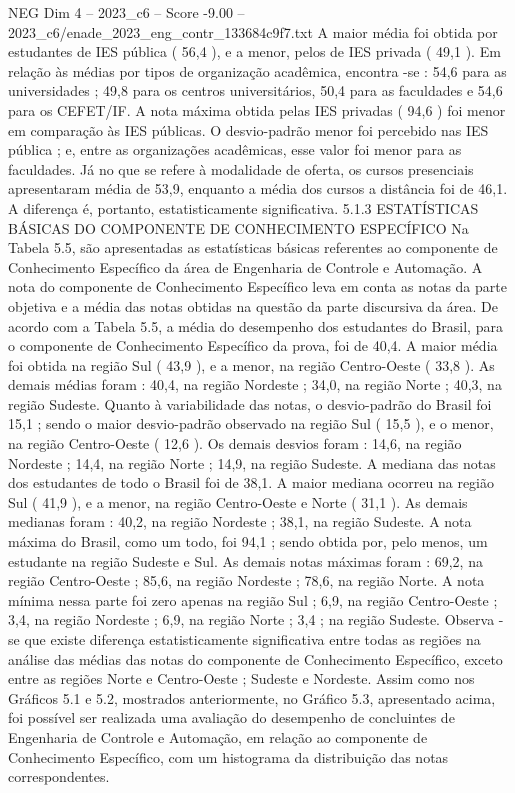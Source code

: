 \begin{textsample}{NEG Dim 4 – 2023\_c6 – Score -9.00 – 2023\_c6/enade\_2023\_eng\_contr\_133684c9f7.txt}
A maior média foi obtida por estudantes de IES pública ( 56,4 ), e a menor, pelos de IES privada ( 49,1 ).
Em relação às médias por tipos de organização acadêmica, encontra -se : 54,6 para as universidades ; 49,8 para os centros universitários, 50,4 para as faculdades e 54,6 para os CEFET/IF.
A nota máxima obtida pelas IES privadas ( 94,6 ) foi menor em comparação às IES públicas.
O desvio-padrão menor foi percebido nas IES pública ; e, entre as organizações acadêmicas, esse valor foi menor para as faculdades.
Já no que se refere à modalidade de oferta, os cursos presenciais apresentaram média de 53,9, enquanto a média dos cursos a distância foi de 46,1.
A diferença é, portanto, estatisticamente significativa. 5.1.3 ESTATÍSTICAS BÁSICAS DO COMPONENTE DE CONHECIMENTO ESPECÍFICO Na Tabela 5.5, são apresentadas as estatísticas básicas referentes ao componente de Conhecimento Específico da área de Engenharia de Controle e Automação.
A nota do componente de Conhecimento Específico leva em conta as notas da parte objetiva e a média das notas obtidas na questão da parte discursiva da área.
De acordo com a Tabela 5.5, a média do desempenho dos estudantes do Brasil, para o componente de Conhecimento Específico da prova, foi de 40,4.
A maior média foi obtida na região Sul ( 43,9 ), e a menor, na região Centro-Oeste ( 33,8 ).
As demais médias foram : 40,4, na região Nordeste ; 34,0, na região Norte ; 40,3, na região Sudeste.
Quanto à variabilidade das notas, o desvio-padrão do Brasil foi 15,1 ; sendo o maior desvio-padrão observado na região Sul ( 15,5 ), e o menor, na região Centro-Oeste ( 12,6 ).
Os demais desvios foram : 14,6, na região Nordeste ; 14,4, na região Norte ; 14,9, na região Sudeste.
A mediana das notas dos estudantes de todo o Brasil foi de 38,1.
A maior mediana ocorreu na região Sul ( 41,9 ), e a menor, na região Centro-Oeste e Norte ( 31,1 ).
As demais medianas foram : 40,2, na região Nordeste ; 38,1, na região Sudeste.
A nota máxima do Brasil, como um todo, foi 94,1 ; sendo obtida por, pelo menos, um estudante na região Sudeste e Sul.
As demais notas máximas foram : 69,2, na região Centro-Oeste ; 85,6, na região Nordeste ; 78,6, na região Norte.
A nota mínima nessa parte foi zero apenas na região Sul ; 6,9, na região Centro-Oeste ; 3,4, na região Nordeste ; 6,9, na região Norte ; 3,4 ; na região Sudeste.
Observa -se que existe diferença estatisticamente significativa entre todas as regiões na análise das médias das notas do componente de Conhecimento Específico, exceto entre as regiões Norte e Centro-Oeste ; Sudeste e Nordeste.
Assim como nos Gráficos 5.1 e 5.2, mostrados anteriormente, no Gráfico 5.3, apresentado acima, foi possível ser realizada uma avaliação do desempenho de concluintes de Engenharia de Controle e Automação, em relação ao componente de Conhecimento Específico, com um histograma da distribuição das notas correspondentes.

\end{textsample}
